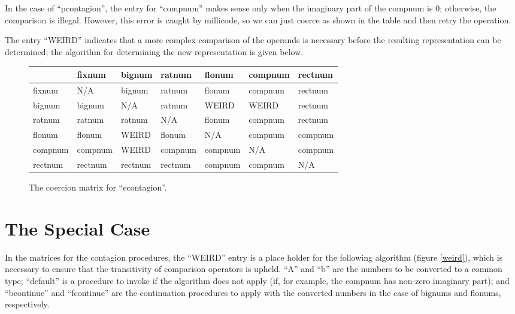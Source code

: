 In the case of ``pcontagion'', the entry for ``compnum'' makes sense
only when the imaginary part of the compnum is 0; otherwise, the
comparison is illegal. However, this error is caught by millicode, so we
can just coerce as shown in the table and then retry the operation.

The entry ``WEIRD'' indicates that a more complex comparison of the operands
is necessary before the resulting representation can be determined; the
algorithm for determining the new representation is given below.

\begin{figure}[hbt]
\begin{center}
\begin{tabular}{|l||l|l|l|l|l|l|} \hline
        & fixnum  & bignum  & ratnum  & flonum  & compnum & rectnum\\ \hline \hline
fixnum  & N/A     & bignum  & ratnum  & flonum  & compnum & rectnum \\ \hline
bignum  & bignum  & N/A     & ratnum  & WEIRD   & WEIRD   & rectnum \\ \hline
ratnum  & ratnum  & ratnum  & N/A     & flonum  & compnum & rectnum \\ \hline
flonum  & flonum  & WEIRD   & flonum  & N/A     & compnum & compnum \\ \hline
compnum & compnum & WEIRD   & compnum & compnum & N/A     & compnum \\ \hline
rectnum & rectnum & rectnum & rectnum & compnum & compnum & N/A     \\ \hline
\end{tabular}
\end{center}
\caption{The coercion matrix for ``econtagion''.}
\label{econtagion}
\end{figure}

\section{The Special Case}

In the matrices for the contagion procedures, the ``WEIRD'' entry is a
place holder for the following algorithm (figure \ref{weird}), which
is necessary to ensure that the transitivity of comparison operators
is upheld. ``A'' and ``b'' are the numbers to be converted to a common
type; ``default'' is a procedure to invoke if the algorithm does not
apply (if, for example, the compnum has non-zero imaginary part); and
``bcontinue'' and ``fcontinue'' are the continuation procedures to
apply with the converted numbers in the case of bignums and flonums,
respectively.

